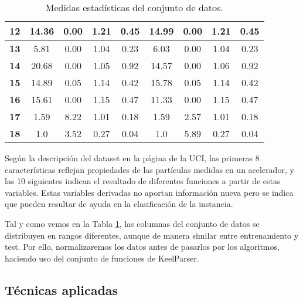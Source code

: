 \begin{table}[H]
\begin{tabular}{c|c|c|c|c||c|c|c|c|}
    \multicolumn{1}{|c|}{\textbf{12}}         & 14.36  & 0.00   & 1.21    & 0.45        & 14.99  & 0.00   & 1.21    & 0.45              \\ \hline
    \multicolumn{1}{|c|}{\textbf{13}}         & 5.81   & 0.00   & 1.04    & 0.23        & 6.03   & 0.00   & 1.04    & 0.23              \\ \hline
    \multicolumn{1}{|c|}{\textbf{14}}         & 20.68  & 0.00   & 1.05    & 0.92        & 14.57  & 0.00   & 1.06    & 0.92              \\ \hline
    \multicolumn{1}{|c|}{\textbf{15}}         & 14.89  & 0.05   & 1.14    & 0.42        & 15.78  & 0.05   & 1.14    & 0.42              \\ \hline
    \multicolumn{1}{|c|}{\textbf{16}}         & 15.61  & 0.00   & 1.15    & 0.47        & 11.33  & 0.00   & 1.15    & 0.47              \\ \hline
    \multicolumn{1}{|c|}{\textbf{17}}         & 1.59   & 8.22   & 1.01    & 0.18        & 1.59   & 2.57   & 1.01    & 0.18              \\ \hline
    \multicolumn{1}{|c|}{\textbf{18}}         & 1.0    & 3.52   & 0.27    & 0.04        & 1.0    & 5.89   & 0.27    & 0.04              \\ \hline
    \end{tabular}
    \caption{Medidas estadísticas del conjunto de datos.}
    \label{statistics}
\end{table}

Según la descripción del dataset en la página de la UCI, las primeras 8 características reflejan propiedades de las partículas medidas en un acelerador, y las 10 siguientes indican el resultado de diferentes funciones a partir de estas variables. Estas variables derivadas no aportan información nueva pero se indica que pueden resultar de ayuda en la clasificación de la instancia.

\vspace{\baselineskip}

Tal y como vemos en la Tabla \ref{statistics}, las columnas del conjunto de datos se distribuyen en rangos diferentes, aunque de manera similar entre entrenamiento y test. Por ello, normalizaremos los datos antes de pasarlos por los algoritmos, haciendo uso del conjunto de funciones de KeelParser.

\newpage

\subsection{Técnicas aplicadas}


